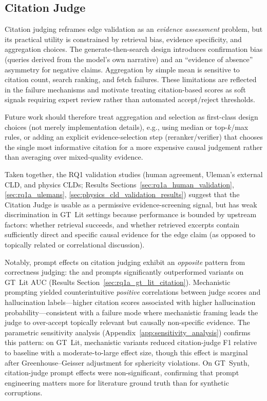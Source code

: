 \subsection{Citation Judge}
\label{sec:discussion_citation_aggregation}
Citation judging reframes edge validation as an \emph{evidence assessment} problem, but its practical utility is constrained by retrieval bias, evidence specificity, and aggregation choices. The generate-then-search design introduces confirmation bias (queries derived from the model's own narrative) and an ``evidence of absence'' asymmetry for negative claims. Aggregation by simple mean is sensitive to citation count, search ranking, and fetch failures. These limitations are reflected in the failure mechanisms and motivate treating citation-based scores as soft signals requiring expert review rather than automated accept/reject thresholds.

Future work should therefore treat aggregation and selection as first-class design choices (not merely implementation details), e.g., using median or top-$k$/max rules, or adding an explicit evidence-selection step (reranker/verifier) that chooses the single most informative citation for a more expensive causal judgement rather than averaging over mixed-quality evidence.

Taken together, the RQ1 validation studies (human agreement, Uleman's external CLD, and physics CLDs; Results Sections~\ref{sec:rq1a_human_validation}, \ref{sec:rq1a_ulemans}, \ref{sec:physics_cld_validation_results}) suggest that the Citation Judge is usable as a permissive evidence-screening signal, but has weak discrimination in GT~Lit settings because performance is bounded by upstream factors: whether retrieval succeeds, and whether retrieved excerpts contain sufficiently direct and specific causal evidence for the edge claim (as opposed to topically related or correlational discussion).

Notably, prompt effects on citation judging exhibit an \emph{opposite} pattern from correctness judging: the \PromptBaseline{} and \PromptCoT{} prompts significantly outperformed \PromptMechanistic{} variants on GT~Lit AUC (Results Section~\ref{sec:rq1a_gt_lit_citation}). Mechanistic prompting yielded counterintuitive \emph{positive} correlations between judge scores and hallucination labels---higher citation scores associated with higher hallucination probability---consistent with a failure mode where mechanistic framing leads the judge to over-accept topically relevant but causally non-specific evidence. The parametric sensitivity analysis (Appendix~\ref{app:sensitivity_analysis}) confirms this pattern: on GT~Lit, mechanistic variants reduced citation-judge F1 relative to baseline with a moderate-to-large effect size, though this effect is marginal after Greenhouse--Geisser adjustment for sphericity violations. On GT~Synth, citation-judge prompt effects were non-significant, confirming that prompt engineering matters more for literature ground truth than for synthetic corruptions.

